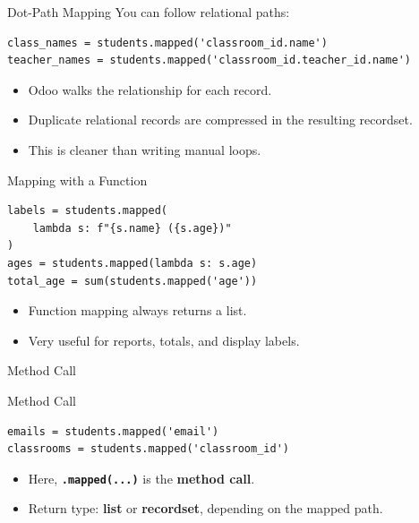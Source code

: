 \begin{frame}[fragile]{Dot-Path Mapping}
	You can follow relational paths:
\begin{lstlisting}
class_names = students.mapped('classroom_id.name')
teacher_names = students.mapped('classroom_id.teacher_id.name')
\end{lstlisting}
	\begin{itemize}
		\item Odoo walks the relationship for each record.
		\item Duplicate relational records are compressed in the resulting recordset.
		\item This is cleaner than writing manual loops.
	\end{itemize}
\end{frame}

\begin{frame}[fragile]{Mapping with a Function}
\begin{lstlisting}
labels = students.mapped(
	lambda s: f"{s.name} ({s.age})"
)
ages = students.mapped(lambda s: s.age)
total_age = sum(students.mapped('age'))
\end{lstlisting}
	\begin{itemize}
		\item Function mapping always returns a list.
		\item Very useful for reports, totals, and display labels.
	\end{itemize}
\end{frame}

\begin{frame}[fragile]{Method Call}
\begin{block}{Method Call}
\begin{lstlisting}
emails = students.mapped('email')
classrooms = students.mapped('classroom_id')
\end{lstlisting}
	\begin{itemize}
		\item Here, \textbf{\texttt{.mapped(...)}} is the \textbf{method call}.
		\item Return type: \textbf{list} or \textbf{recordset}, depending on the mapped path.
	\end{itemize}
\end{block}
\end{frame}
